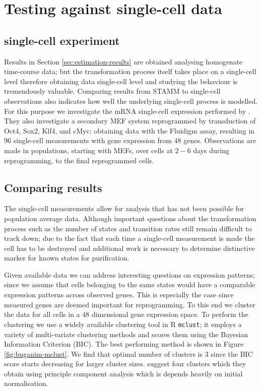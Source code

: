 \section{Testing against single-cell data}
\label{sec:test-single-cell}

\subsection{single-cell experiment}
\label{sec:single-cell-exper}

Results in Section \ref{sec:estimation-results} are obtained analysing homogenate time-course data; but the transformation process itself takes place on a single-cell level therefore obtaining data single-cell level and studying the behaviour is tremendously valuable. Comparing results from STAMM to single-cell observations also indicates how well the underlying single-cell process is modelled. For this purpose we investigate the mRNA single-cell expression performed by \cite{Buganim:2012hp}. They also investigate a secondary MEF system reprogrammed by transduction of Oct4, Sox2, Klf4, and cMyc; obtaining data with the Fluidigm assay, resulting in $96$ single-cell measurements with gene expression from $48$ genes. Observations are made in populations, starting with MEFs, over cells at $2 - 6$ days during reprogramming, to the final reprogrammed cells.

\subsection{Comparing results}
\label{sec:comparing-results}

The single-cell measurements \citep{Buganim:2012hp} allow for analysis that has not been possible for population average data. Although important questions about the transformation process such as the number of states and transition rates still remain difficult to track down; due to the fact that each time a single-cell measurement is made the cell has to be destroyed and additional work is necessary to determine distinctive marker for known states for purification. 

Given available data we can address interesting questions on expression patterns; since we assume that cells belonging to the same states would have a comparable expression patterns across observed genes. This is especially the case since measured genes are deemed important for reprogramming. To this end we cluster the data for all cells in a $48$ dimensional gene expression space. To perform the clustering we use a widely available clustering tool in R \texttt{mclust}; it employs a variety of multi-variate clustering methods and scores them using the Bayesian Information Criterion (BIC). The best performing method is shown in Figure \ref{fig:buganim-mclust}. We find that optimal number of clusters is $3$ since the BIC score starts decreasing for larger cluster sizes. \cite{Buganim:2012hp} suggest four clusters which they obtain using principle component analysis which is depends heavily on initial normalisation.

